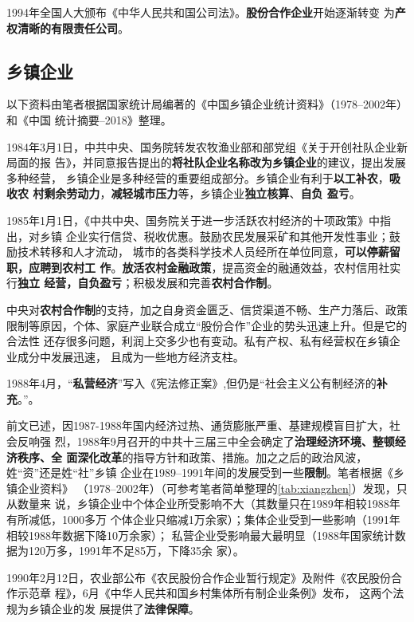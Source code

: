 1994年全国人大颁布《中华人民共和国公司法》。\textbf{股份合作企业}开始逐渐转变
为\textbf{产权清晰的有限责任公司}。

\subsection{乡镇企业}

以下资料由笔者根据国家统计局编著的《中国乡镇企业统计资料》（1978--2002年）和《中国
统计摘要--2018》整理。




1984年3月1日，中共中央、国务院转发农牧渔业部和部党组《关于开创社队企业新局面的报
告》，并同意报告提出的\textbf{将社队企业名称改为乡镇企业}的建议，提出发展多种经营，
乡镇企业是多种经营的重要组成部分。乡镇企业有利于\textbf{以工补农}，\textbf{吸收农
  村剩余劳动力}，\textbf{减轻城市压力}等，乡镇企业\textbf{独立核算}、\textbf{自负
  盈亏}。

1985年1月1日，《中共中央、国务院关于进一步活跃农村经济的十项政策》中指出，对乡镇
企业实行信贷、税收优惠。鼓励农民发展采矿和其他开发性事业；鼓励技术转移和人才流动，
城市的各类科学技术人员经所在单位同意，\textbf{可以停薪留职，应聘到农村工
  作}。\textbf{放活农村金融政策}，提高资金的融通效益，农村信用社实行\textbf{独立
  经营，自负盈亏}；积极发展和完善\textbf{农村合作制}。

中央对\textbf{农村合作制}的支持，加之自身资金匮乏、信贷渠道不畅、生产力落后、政策
限制等原因，个体、家庭产业联合成立“股份合作”企业的势头迅速上升。但是它的合法性
还存很多问题，利润上交多少也有变动。私有产权、私有经营权在乡镇企业成分中发展迅速，
且成为一些地方经济支柱。

1988年4月，“\textbf{私营经济}”写入《宪法修正案》,但仍是“社会主义公有制经济的\textbf{补
充}。”。

前文已述，因1987-1988年国内经济过热、通货膨胀严重、基建规模盲目扩大，社会反响强
烈，1988年9月召开的中共十三届三中全会确定了\textbf{治理经济环境、整顿经济秩序、全
  面深化改革}的指导方针和政策、措施。加之之后的政治风波，姓“资”还是姓“社”乡镇
企业在1989--1991年间的发展受到一些\textbf{限制}。笔者根据《乡镇企业资料》
（1978--2002年）（可参考笔者简单整理的\cref{tab:xiangzhen}）发现，只从数量来
说，乡镇企业中个体企业所受影响不大（其数量只在1989年相较1988年有所减低，1000多万
个体企业只缩减1万余家）；集体企业受到一些影响（1991年相较1988年数据下降10万余家）；
私营企业受影响最大最明显（1988年国家统计数据为120万多，1991年不足85万，下降35余
家）。

1990年2月12日，农业部公布《农民股份合作企业暂行规定》及附件《农民股份合作示范章
程》，6月《中华人民共和国乡村集体所有制企业条例》发布， 这两个法规为乡镇企业的发
展提供了\textbf{法律保障}。

